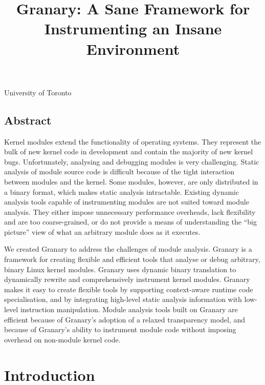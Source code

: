 \documentclass[preprint]{sigplanconf}
\begin{document}
\title{Granary: A Sane Framework for Instrumenting an Insane Environment}

{University of Toronto}{}

\maketitle
\subsection*{Abstract}
Kernel modules extend the functionality of operating systems. They represent the bulk of new kernel code in development and contain the majority of new kernel bugs. Unfortunately, analysing and debugging modules is very challenging. Static analysis of module source code is difficult because of the tight interaction between modules and the kernel. Some modules, however, are only distributed in a binary format, which makes static analysis intractable. Existing dynamic analysis tools capable of instrumenting modules are not suited toward module analysis. They either impose unnecessary performance overheads, lack flexibility and are too coarse-grained, or do not provide a means of understanding the ``big picture'' view of what an arbitrary module does as it executes.

We created Granary to address the challenges of module analysis. Granary is a framework for creating flexible and efficient tools that analyse or debug arbitrary, binary Linux kernel modules. Granary uses dynamic binary translation to dynamically rewrite and comprehensively instrument kernel modules. Granary makes it easy to create flexible tools by supporting context-aware runtime code specialisation, and by integrating high-level static analysis information with low-level instruction manipulation. Module analysis tools built on Granary are efficient because of Granary's adoption of a relaxed transparency model, and because of Granary's ability to instrument module code without imposing overhead on non-module kernel code.


\section{Introduction}\label{sec:intro}
\end{document}
